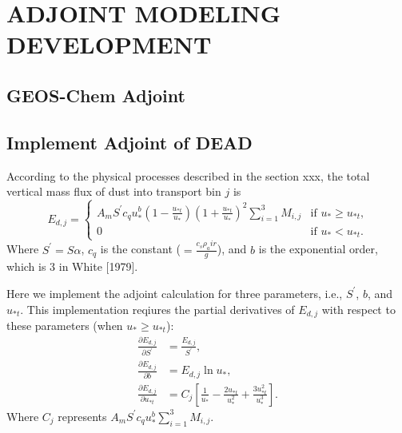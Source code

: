 \chapter{ADJOINT MODELING DEVELOPMENT}

\section{GEOS-Chem Adjoint}
\section{Implement Adjoint of DEAD}

   According to the physical processes described in the section xxx, the total
   vertical mass flux of dust into transport bin $j$ is 
   \begin{equation}
   E_{d,j} = 
     \begin{cases} A_m S^\prime c_q u_*^b\left(1-\frac{u_{*t}}{u_*}\right)
                   \left(1+\frac{u_{*t}}{u_*}\right)^2
                   \displaystyle \sum_{i=1}^3 M_{i,j} & \mbox{if $u_* \geq u_{*t}$,} \\
                   0 & \mbox{if $u_* < u_{*t}$.}
     \end{cases}
   \end{equation}
   Where $S^\prime = S \alpha$, $c_q$ is the constant ($=\frac{c_s \rho_air}{g}$), 
   and $b$ is the exponential order, which is 3 in White [1979].

   Here we implement the adjoint calculation for three parameters, i.e., 
   $S^\prime$, $b$, and $u_{*t}$. This implementation reqiures the partial
   derivatives of $E_{d,j}$ with respect to these parameters (when 
   $u_* \geq u_{*t}$): 
   \begingroup
   \allowdisplaybreaks
   \begin{align}
     \frac{\partial E_{d,j}}{\partial S^\prime} 
       &= \frac{E_{d,j}}{S^\prime}\mbox{,} \\
     \frac{\partial E_{d,j}}{\partial b} 
       &= E_{d,j} \ln{u_*}\mbox{,} \\
     \frac{\partial E_{d,j}}{\partial u_{*t}}
       & = C_j \left[\frac{1}{u_*} - \frac{2u_{*t}}{u_*^2} 
         + \frac{3u_{*t}^2}{u_*^3}\right] \mbox{.} 
   \end{align}
   \endgroup
   Where $C_j$ represents $\displaystyle A_m S^\prime c_q u_*^b \sum_{i=1}^{3} M_{i,j}$. 
